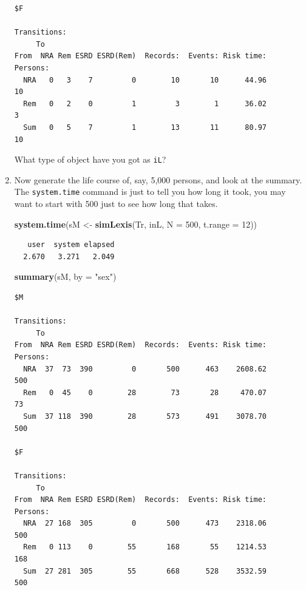 \documentclass[
]{book}
\newenvironment{Shaded}{\begin{snugshade}}{\end{snugshade}}
\newcommand{\AttributeTok}[1]{\textcolor[rgb]{0.13,0.29,0.53}{#1}}
\newcommand{\DecValTok}[1]{\textcolor[rgb]{0.00,0.00,0.81}{#1}}
\newcommand{\FunctionTok}[1]{\textcolor[rgb]{0.13,0.29,0.53}{\textbf{#1}}}
\newcommand{\NormalTok}[1]{#1}
\newcommand{\OtherTok}[1]{\textcolor[rgb]{0.56,0.35,0.01}{#1}}
\newcommand{\StringTok}[1]{\textcolor[rgb]{0.31,0.60,0.02}{#1}}
\begin{document}
\begin{enumerate}
\begin{verbatim}
$F

Transitions:
     To
From  NRA Rem ESRD ESRD(Rem)  Records:  Events: Risk time:  Persons:
  NRA   0   3    7         0        10       10      44.96        10
  Rem   0   2    0         1         3        1      36.02         3
  Sum   0   5    7         1        13       11      80.97        10
\end{verbatim}

  What type of object have you got as \texttt{iL}?
\item
  Now generate the life course of, say, 5,000 persons, and look at the summary.
  The \texttt{system.time} command is just to tell you how long it
  took, you may want to start with 500 just to see how long that takes.

\begin{Shaded}
\begin{Highlighting}[]
\FunctionTok{system.time}\NormalTok{(sM }\OtherTok{\textless{}{-}} \FunctionTok{simLexis}\NormalTok{(Tr, inL, }\AttributeTok{N =} \DecValTok{500}\NormalTok{, }\AttributeTok{t.range =} \DecValTok{12}\NormalTok{))}
\end{Highlighting}
\end{Shaded}

\begin{verbatim}
   user  system elapsed 
  2.670   3.271   2.049 
\end{verbatim}

\begin{Shaded}
\begin{Highlighting}[]
\FunctionTok{summary}\NormalTok{(sM, }\AttributeTok{by =} \StringTok{"sex"}\NormalTok{)}
\end{Highlighting}
\end{Shaded}

\begin{verbatim}
$M

Transitions:
     To
From  NRA Rem ESRD ESRD(Rem)  Records:  Events: Risk time:  Persons:
  NRA  37  73  390         0       500      463    2608.62       500
  Rem   0  45    0        28        73       28     470.07        73
  Sum  37 118  390        28       573      491    3078.70       500

$F

Transitions:
     To
From  NRA Rem ESRD ESRD(Rem)  Records:  Events: Risk time:  Persons:
  NRA  27 168  305         0       500      473    2318.06       500
  Rem   0 113    0        55       168       55    1214.53       168
  Sum  27 281  305        55       668      528    3532.59       500
\end{verbatim}


\end{enumerate}
\end{document}
